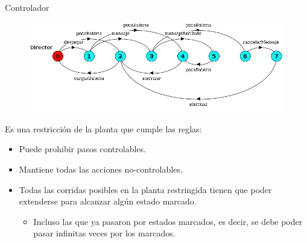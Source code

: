 \begin{frame}{Controlador}
    \begin{figure}
     \includegraphics[width=\textwidth]{figures/director.png}
    \end{figure}

    Es una restricción de la planta que cumple las reglas:
    \begin{itemize}
     \item Puede prohibir pasos controlables.
     \item Mantiene todas las acciones no-controlables.
     \item Todas las corridas posibles en la planta restringida tienen que poder extenderse para alcanzar algún estado marcado.
         \begin{itemize}
            \item Incluso las que ya pasaron por estados marcados, es decir, se debe poder pasar infinitas veces por los marcados.
         \end{itemize}
    \end{itemize}
\end{frame}
